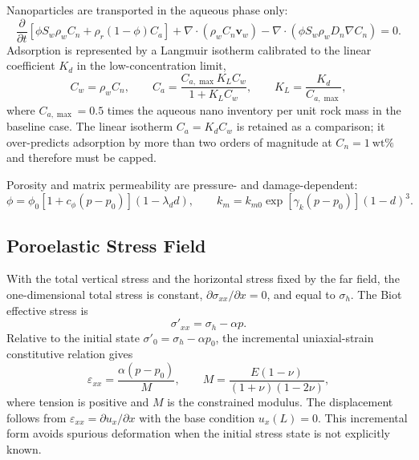 Nanoparticles are transported in the aqueous phase only:
\begin{equation}
\frac{\partial}{\partial t}\left[\phi S_w\rho_wC_n
+\rho_r(1-\phi)C_a\right]
+\nabla\cdot\left(\rho_wC_n\mathbf v_w\right)
-\nabla\cdot\left(\phi S_w\rho_wD_n\nabla C_n\right)=0 .
\label{eq:nano}
\end{equation}
Adsorption is represented by a Langmuir isotherm calibrated to the linear
coefficient $K_d$ in the low-concentration limit,
\begin{equation}
C_w=\rho_wC_n,\qquad
C_a=\frac{C_{a,\max}K_LC_w}{1+K_LC_w},\qquad
K_L=\frac{K_d}{C_{a,\max}},
\label{eq:langmuir}
\end{equation}
where $C_{a,\max}=0.5$ times the aqueous nano inventory per unit rock mass in
the baseline case. The linear isotherm $C_a=K_dC_w$ is retained as a
comparison; it over-predicts adsorption by more than two orders of magnitude
at $C_n=1~\mathrm{wt\%}$ and therefore must be capped.

Porosity and matrix permeability are pressure- and damage-dependent:
\begin{equation}
\phi=\phi_0\left[1+c_\phi(p-p_0)\right](1-\lambda_d d),\qquad
k_m=k_{m0}\exp\left[\gamma_k(p-p_0)\right](1-d)^3 .
\label{eq:phik}
\end{equation}

\subsection{Poroelastic Stress Field}

With the total vertical stress and the horizontal stress fixed by the
far field, the one-dimensional total stress is constant,
$\partial\sigma_{xx}/\partial x=0$, and equal to $\sigma_h$. The Biot
effective stress is
\begin{equation}
\sigma'_{xx}=\sigma_h-\alpha p .
\label{eq:biot}
\end{equation}
Relative to the initial state $\sigma'_{0}=\sigma_h-\alpha p_0$, the
incremental uniaxial-strain constitutive relation gives
\begin{equation}
\varepsilon_{xx}=\frac{\alpha\left(p-p_0\right)}{M},
\qquad
M=\frac{E(1-\nu)}{(1+\nu)(1-2\nu)},
\label{eq:strain}
\end{equation}
where tension is positive and $M$ is the constrained modulus. The displacement
follows from $\varepsilon_{xx}=\partial u_x/\partial x$ with the base
condition $u_x(L)=0$. This incremental form avoids spurious deformation when
the initial stress state is not explicitly known.

